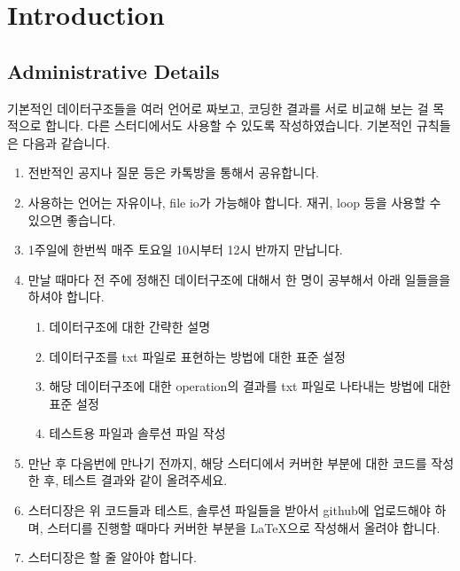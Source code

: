 
\section{Introduction}

\subsection{Administrative Details}

기본적인 데이터구조들을 여러 언어로 짜보고, 코딩한 결과를 서로 비교해 보는 걸 목적으로 합니다. 다른 스터디에서도 사용할 수 있도록 작성하였습니다. 기본적인 규칙들은 다음과 같습니다. 

\begin{enumerate}

\item 전반적인 공지나 질문 등은 카톡방을 통해서 공유합니다. 
\item 사용하는 언어는 자유이나, file io가 가능해야 합니다. 재귀, loop 등을 사용할 수 있으면 좋습니다. 

\item 1주일에 한번씩 매주 토요일 10시부터 12시 반까지 만납니다. 

\item 만날 때마다 전 주에 정해진 데이터구조에 대해서 한 명이 공부해서 아래 일들을을 하셔야 합니다.

\begin{enumerate}
\item 데이터구조에 대한 간략한 설명 
\item 데이터구조를 txt 파일로 표현하는 방법에 대한 표준 설정 
\item 해당 데이터구조에 대한 operation의 결과를 txt 파일로 나타내는 방법에 대한 표준 설정 
\item 테스트용 파일과 솔루션 파일 작성
\end{enumerate}

\item 만난 후 다음번에 만나기 전까지, 해당 스터디에서 커버한 부분에 대한 코드를 작성한 후, 테스트 결과와 같이 올려주세요. 

\item 스터디장은 위 코드들과 테스트, 솔루션 파일들을 받아서 github에 업로드해야 하며, 스터디를 진행할 때마다 커버한 부분을 \LaTeX 으로 작성해서 올려야 합니다. 

\item 스터디장은  할 줄 알아야 합니다. 

\end{enumerate}

